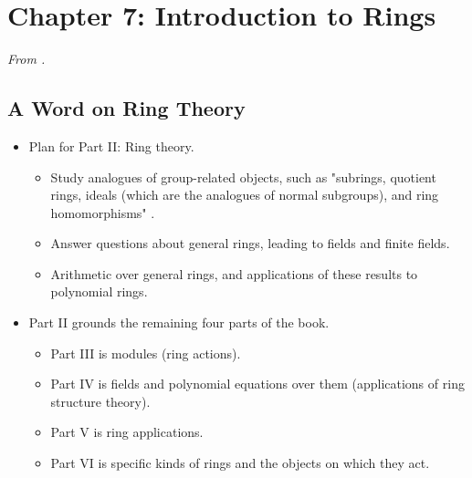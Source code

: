 \documentclass[../notes.tex]{subfiles}
\begin{document}
\section{Chapter 7: Introduction to Rings}
\emph{From \textcite{bib:DummitFoote}.}
\subsection*{A Word on Ring Theory}
\begin{itemize}
    \item {}Plan for Part II: Ring theory.
    \begin{itemize}
        \item Study analogues of group-related objects, such as "subrings, quotient rings, ideals (which are the analogues of normal subgroups), and ring homomorphisms" \parencite[222]{bib:DummitFoote}.
        \item Answer questions about general rings, leading to fields and finite fields.
        \item Arithmetic over general rings, and applications of these results to polynomial rings.
    \end{itemize}
    \item Part II grounds the remaining four parts of the book.
    \begin{itemize}
        \item Part III is modules (ring actions).
        \item Part IV is fields and polynomial equations over them (applications of ring structure theory).
        \item Part V is ring applications.
        \item Part VI is specific kinds of rings and the objects on which they act.
    \end{itemize}
\end{itemize}
\end{document}
